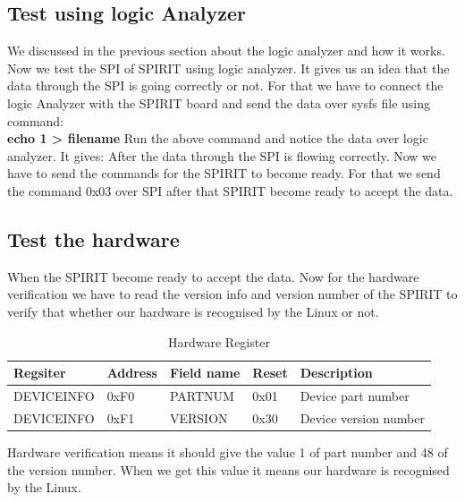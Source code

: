 \subsection{Test using logic Analyzer}
We discussed in the previous section about the logic analyzer and how it works. Now we test the SPI of SPIRIT using logic analyzer. It gives us an idea that the data through the SPI is going correctly or not. For that we have to connect the logic Analyzer with the SPIRIT board and send the data over sysfs file using command:\\
\textbf{echo 1 > filename}
Run the above command and notice the data over logic analyzer. It gives:
After the data through the SPI is flowing correctly. Now we have to send the commands for the SPIRIT to become ready. For that we send the command 0x03 over SPI after that SPIRIT become ready to accept the data. 
\subsection{Test the hardware}
When the SPIRIT become ready to accept the data. Now for the hardware verification we have to read the version info and version number of the SPIRIT to verify that whether our hardware is recognised by the Linux or not.
\begin{table}[ht]
	\centering
	\scalebox{0.85}
	{
	\begin{tabular}{|K{5cm} | K{2cm} | K{5cm} | K{2cm} | K{5cm}|}
	\toprule
	\textbf{Regsiter} & \textbf{Address} & \textbf{Field name} & \textbf{Reset} & \textbf{Description} \\
	\hline
	DEVICEINFO & 0xF0 & PARTNUM & 0x01 & Device part number \\
	\hline
	DEVICEINFO & 0xF1 & VERSION & 0x30 & Device version number \\
	\bottomrule
	\end{tabular}
	}
	\caption{Hardware Register}
\end{table}
Hardware verification means it should give the value 1 of part number and 48 of the version number. When we get this value it means our hardware is recognised by the Linux.





